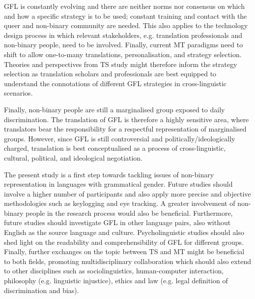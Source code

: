 GFL is constantly evolving and there are neither norms nor consensus on which and how a specific strategy is to be used; constant training and contact with the queer and non-binary community are needed. This also applies to the technology design process in which relevant stakeholders, e.g. translation professionals and non-binary people, need to be involved. Finally, current MT paradigms need to shift to allow one-to-many translations, personalisation, and strategy selection. Theories and perspectives from TS study might therefore inform the strategy selection as translation scholars and professionals are best equipped to understand the connotations of different GFL strategies in cross-linguistic scenarios.

Finally, non-binary people are still a marginalised group exposed to daily discrimination. The translation of GFL is therefore a highly sensitive area, where translators bear the responsibility for a respectful representation of marginalised groups. However, since GFL is still controversial and politically/ideologically charged, translation is best conceptualised as a process of cross-linguistic, cultural, political, and ideological negotiation. 
 
The present study is a first step towards tackling issues of non-binary representation in languages with grammatical gender. Future studies should involve a higher number of participants and also apply more precise and objective methodologies such as keylogging and eye tracking. A greater involvement of non-binary people in the research process would also be beneficial. Furthermore, future studies should investigate GFL in other language pairs, also without English as the source language and culture. Psycholinguistic studies should also shed light on the readability and comprehensibility of GFL for different groups. Finally, further exchanges on the topic between TS and MT might be beneficial to both fields, promoting multidisciplinary collaboration which should also extend to other disciplines such as sociolinguistics, human-computer interaction, philosophy (e.g. linguistic injustice), ethics and law (e.g. legal definition of discrimination and bias). 
